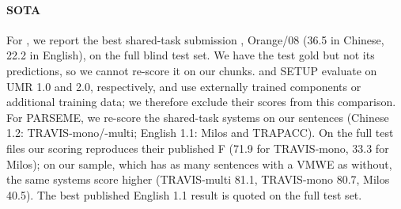 \paragraph{SOTA}
For \umr, we report the best shared-task submission \citep{stepanek2026first}, Orange/08 \citep{heinecke2026orange} (36.5 \jm{} in Chinese, 22.2 in English), on the full blind test set. We have the test gold but not its predictions, so we cannot re-score it on our chunks. \citet{chun2024pipeline} and SETUP \citep{markle2026setup} evaluate on UMR 1.0 and 2.0, respectively, and use externally trained components or additional training data; we therefore exclude their scores from this comparison. For PARSEME, we re-score the shared-task systems on our sentences (Chinese 1.2: TRAVIS-mono/-multi; English 1.1: Milos and TRAPACC). On the full test files our scoring reproduces their published F (71.9 for TRAVIS-mono, 33.3 for Milos); on our sample, which has as many sentences with a VMWE as without, the same systems score higher (TRAVIS-multi 81.1, TRAVIS-mono 80.7, Milos 40.5). The best published English 1.1 result \citep{rohanian2019bridging} is quoted on the full test set.
